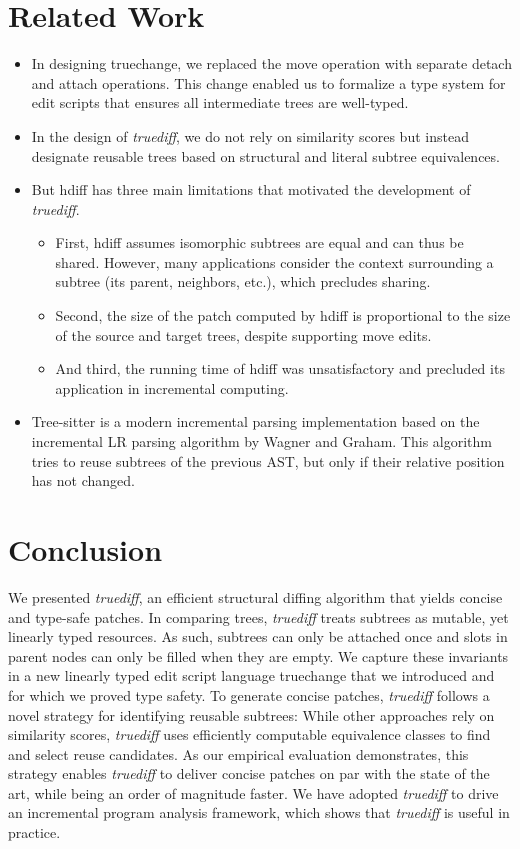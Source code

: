 \section{Related Work}
\begin{itemize}
    \item In designing truechange, we replaced the move operation with separate detach and attach operations. This change enabled us to formalize a type system for edit scripts that ensures all intermediate trees are well-typed.
    \item In the design of \textit{truediff}, we do not rely on similarity scores but instead designate reusable trees based on structural and literal subtree equivalences.
    \item But hdiff has three main limitations that motivated the development of \textit{truediff}. 
    \begin{itemize}
        \item First, hdiff assumes isomorphic subtrees are equal and can thus be shared. However, many applications consider the context surrounding a subtree (its parent, neighbors, etc.), which precludes sharing.
        \item Second, the size of the patch computed by hdiff is proportional to the size of the source and target trees, despite supporting move edits.
        \item And third, the running time of hdiff was unsatisfactory and precluded its application in incremental computing.
    \end{itemize}
    \item Tree-sitter is a modern incremental parsing implementation based on the incremental LR parsing algorithm by Wagner and Graham. This algorithm tries to reuse subtrees of the previous AST, but only if their relative position has not changed.
\end{itemize}

\newpage
\section{Conclusion}
We presented \textit{truediff}, an efficient structural diffing algorithm that yields concise and type-safe patches. In comparing trees, \textit{truediff} treats subtrees as mutable, yet linearly typed resources. As such, subtrees can only be attached once and slots in parent nodes can only be filled when they are empty. We capture these invariants in a new linearly typed edit script language truechange that we introduced and for which we proved type safety. To generate concise patches, \textit{truediff} follows a novel strategy for identifying reusable subtrees: While other approaches rely on similarity scores, \textit{truediff} uses efficiently computable equivalence classes to find and select reuse candidates. As our empirical evaluation demonstrates, this strategy enables \textit{truediff} to deliver concise patches on par with the state of the art, while being an order of magnitude faster. We have adopted \textit{truediff} to drive an incremental program analysis framework, which shows that \textit{truediff} is useful in practice.